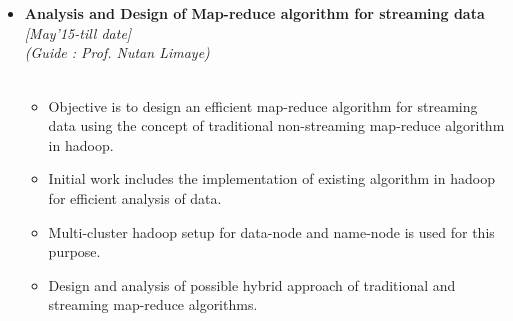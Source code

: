  \\[-.9cm]\\
\begin{itemize}
	\item \textbf{Analysis and Design of Map-reduce algorithm for streaming data} \hfill {\emph{[May'15-till date]}} \\[-0.05cm] 
	\emph{(Guide : Prof. Nutan Limaye)} \hfill \\[-1.1 cm]\\
	\begin{itemize}
		\item Objective is to design an efficient map-reduce algorithm for streaming data using the concept of traditional non-streaming map-reduce algorithm in hadoop.
		\item Initial work includes the implementation of existing algorithm in hadoop for efficient analysis of data.
		\item Multi-cluster hadoop setup for data-node and name-node is used for this purpose.
		\item Design and analysis of possible hybrid approach of traditional and streaming map-reduce algorithms.\\[-1cm]\\
	\end{itemize}
\end{itemize}

